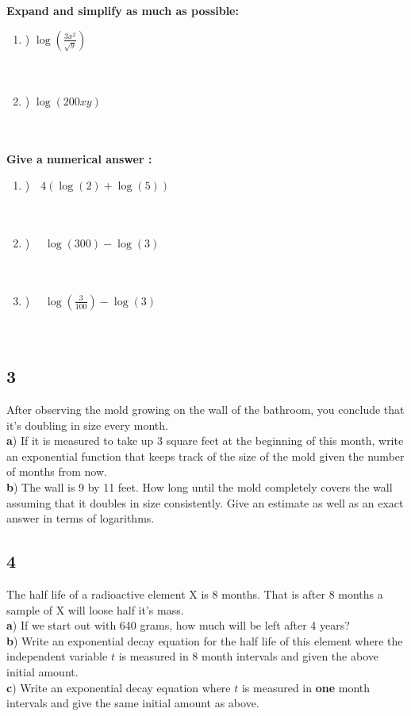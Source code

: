 \documentclass[11pt]{amsart}
\begin{document}
{\bf Expand and simplify as much as possible:} 
\begin{enumerate}[a]
\item) $\displaystyle \log \left(\frac{3x^2}{\sqrt{y}}\right) $\\ \\ \\
\item) $\log(200xy) $ \\ \\ \\
\end{enumerate}

{\bf Give a numerical answer : } 
\begin{enumerate}[a]
\item)\ \ $4(\log(2) + \log(5)) $\\ \\ \\
\item) \  \ $\log(300) - \log( 3) $ \\ \\ \\ 
\item) \ \ $\log(\frac{3}{100}) - \log(3) $ \\ \\ \\ 
\end{enumerate}




\newpage
\subsection*{3} %
After observing the mold growing on the wall of the bathroom, you conclude that it's doubling in size every month.  \\
{\bf a}) If it is measured to take up 3 square feet at the beginning of this month, write an exponential function that keeps track
of the size of the mold given the number of months from now. \\
{\bf b}) The wall is 9 by 11 feet.  How long until the mold completely covers the wall assuming that it doubles in size consistently. 
Give an estimate as well as an exact answer in terms of logarithms. 
\vspace{7cm}
\newpage
\subsection*{4} %
The half life of a radioactive element X is 8 months. That is after 8 months a sample of X will loose half it's mass.\\
{\bf a}) If we start out with 640 grams, how much will be left after 4 years? \\
{\bf b}) Write an exponential decay equation for the half life of this element where the independent variable $t$ is measured in 8 month intervals and given the above
initial amount. \\
{\bf c}) Write an exponential decay equation where $t$ is measured in {\bf one} month intervals and give the same initial amount as above. 
\end{document}
